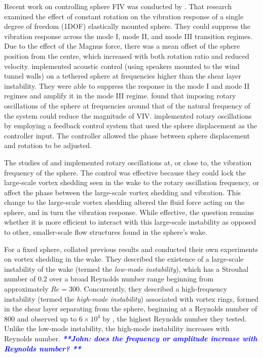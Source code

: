 \documentclass[3p]{elsarticle}
\newcommand{\js}[1]{{\textcolor{blue}{{\bf{\it{ **John: #1 **}}}}}}
\begin{document}
Recent work on controlling sphere FIV was conducted by \citet{Sareen2018}. That research examined the effect of constant rotation 
on the vibration response of a single degree of freedom (1DOF)
elastically mounted sphere. They could suppress the vibration
response across the mode I, mode II, and mode III transition
regimes. Due to the effect of the Magnus force, there was a mean offset
of the sphere position from the centre, which increased with both
rotation ratio and reduced velocity.  implemented
acoustic control (using speakers mounted to the wind tunnel walls) on
a tethered sphere at frequencies higher than the shear layer
instability. They were able to suppress the response in the mode I and
mode II regimes and amplify it in the mode III regime.
\citet{Sareen2018b,Sareen2019} found that imposing rotary
oscillations of the sphere at frequencies around that of the natural
frequency of the system could reduce the magnitude of VIV. \citet{McQueen2020} implemented rotary oscillations by
employing a feedback control system that used the sphere displacement
as the controller input. The controller allowed the 
phase between sphere displacement and rotation to be adjusted.

The studies of \citet{Sareen2018b,Sareen2019} and \citet{McQueen2020}
implemented rotary oscillations at, or close to, the vibration
frequency of the sphere. The control was effective because they could
lock the large-scale vortex shedding seen in the wake
to the rotary oscillation frequency, or affect the phase between the
large-scale vortex shedding and vibration. This change to the
large-scale vortex shedding altered the fluid force acting on the
sphere, and in turn the vibration response. While effective, the
question remains whether it is more efficient to interact with
this large-scale instability as opposed to other, smaller-scale flow
structures found in the sphere's wake.

For a fixed sphere, \citet{Sakamoto1990} collated previous results and
conducted their own experiments on vortex shedding in the wake. They
described the existence of a large-scale instability of the wake
(termed the {\em low-mode instability}), which has a
Strouhal number of 0.2 over a broad Reynolds number range beginning
from approximately $Re=300$. Concurrently, they described a
high-frequency instability (termed the {\em high-mode instability})
associated with vortex rings, formed in the shear layer separating
from the sphere, beginning at a Reynolds number of 800 and observed up to
$6\times10^4$ by \citet{Kim1988}, the highest Reynolds number they
tested. Unlike the low-mode instability, the high-mode instability
increases with Reynolds number. \js{does the frequency or amplitude increase with Reynolds number? } 
  
\end{document}
